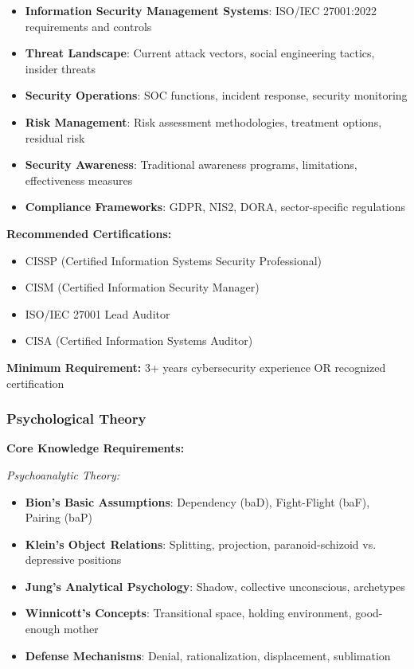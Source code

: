 \documentclass[11pt,a4paper]{article}
\begin{document}
\begin{itemize}
\item \textbf{Information Security Management Systems}: ISO/IEC 27001:2022 requirements and controls
\item \textbf{Threat Landscape}: Current attack vectors, social engineering tactics, insider threats
\item \textbf{Security Operations}: SOC functions, incident response, security monitoring
\item \textbf{Risk Management}: Risk assessment methodologies, treatment options, residual risk
\item \textbf{Security Awareness}: Traditional awareness programs, limitations, effectiveness measures
\item \textbf{Compliance Frameworks}: GDPR, NIS2, DORA, sector-specific regulations
\end{itemize}

\textbf{Recommended Certifications:}
\begin{itemize}
\item CISSP (Certified Information Systems Security Professional)
\item CISM (Certified Information Security Manager)
\item ISO/IEC 27001 Lead Auditor
\item CISA (Certified Information Systems Auditor)
\end{itemize}

\textbf{Minimum Requirement:} 3+ years cybersecurity experience OR recognized certification

\subsubsection{Psychological Theory}

\textbf{Core Knowledge Requirements:}

\textit{Psychoanalytic Theory:}
\begin{itemize}
\item \textbf{Bion's Basic Assumptions}: Dependency (baD), Fight-Flight (baF), Pairing (baP)
\item \textbf{Klein's Object Relations}: Splitting, projection, paranoid-schizoid vs. depressive positions
\item \textbf{Jung's Analytical Psychology}: Shadow, collective unconscious, archetypes
\item \textbf{Winnicott's Concepts}: Transitional space, holding environment, good-enough mother
\item \textbf{Defense Mechanisms}: Denial, rationalization, displacement, sublimation
\end{itemize}
\end{document}

